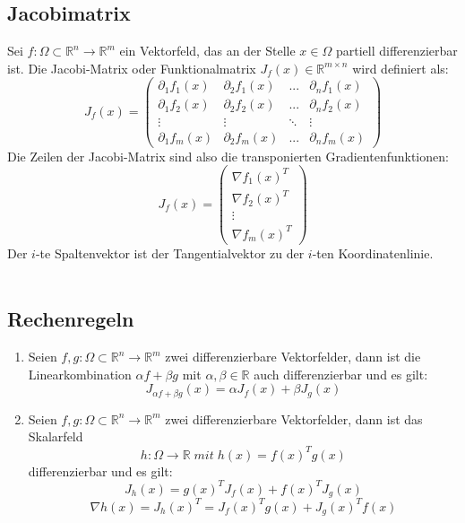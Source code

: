 \documentclass[a4paper,twocolumn,10pt]{article}
\begin{document}
\subsection{Jacobimatrix}
Sei $f:\Omega\subset\mathbb{R}^n\rightarrow\mathbb{R}^m$ ein Vektorfeld, das an der Stelle $x\in \Omega$ partiell differenzierbar ist. Die Jacobi-Matrix oder Funktionalmatrix $J_f(x)\in\mathbb{R}^{m\times n}$ wird definiert als:
\begin{equation*}
J_f(x)=\begin{pmatrix}\partial_1 f_1(x) & \partial_2 f_1(x) & ... & \partial_n f_1(x) \\ \partial_1 f_2(x) & \partial_2 f_2(x) & ... & \partial_n f_2(x) \\ \vdots & \vdots & \ddots & \vdots \\ \partial_1 f_m(x) & \partial_2 f_m(x) & ... & \partial_n f_m(x)\end{pmatrix}
\end{equation*}
Die Zeilen der Jacobi-Matrix sind also die transponierten Gradientenfunktionen:
\begin{equation*}
J_f(x)=\begin{pmatrix}\nabla f_1(x)^T \\ \nabla f_2(x)^T \\ \vdots \\ \nabla f_m(x)^T\end{pmatrix}
\end{equation*}
Der $i$-te Spaltenvektor ist der Tangentialvektor zu der $i$-ten Koordinatenlinie.\\\\

\subsection{Rechenregeln}
\begin{enumerate}[label=$\bullet$]
\item Seien $f,g:\Omega\subset\mathbb{R}^n\rightarrow\mathbb{R}^m$ zwei differenzierbare Vektorfelder, dann ist die Linearkombination $\alpha f+\beta g$ mit $\alpha,\beta\in\mathbb{R}$ auch differenzierbar und es gilt:
\begin{equation*}
J_{\alpha f+\beta g}(x)=\alpha J_f(x)+\beta J_g(x)
\end{equation*}
\item Seien $f,g:\Omega\subset\mathbb{R}^n\rightarrow\mathbb{R}^m$ zwei differenzierbare Vektorfelder, dann ist das Skalarfeld
\begin{equation*}
h:\Omega\rightarrow\mathbb{R}\;mit\;h(x)=f(x)^Tg(x)
\end{equation*}
differenzierbar und es gilt:
\begin{equation*}
J_h(x)=g(x)^TJ_f(x)+f(x)^TJ_g(x)
\end{equation*}
\begin{equation*}
\nabla h(x)=J_h(x)^T=J_f(x)^Tg(x)+J_g(x)^T f(x)
\end{equation*}
\end{enumerate}
\end{document}
